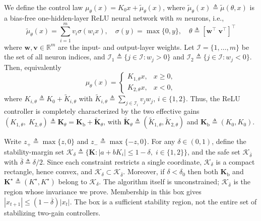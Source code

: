 \documentclass[letterpaper, 10 pt, conference]{ieeeconf}
\newcommand{\R}{\mathbb{R}}
\newcommand{\bv}{\mathbf{v}}
\newcommand{\bw}{\mathbf{w}}
\newcommand{\bK}{\mathbf{K}}
\newcommand{\cK}{\mathcal{K}}
\newcommand{\sI}{\mathscr{I}}
\begin{document}
We define the control law $\mu_{\theta} (x) = K_{0} x + \widetilde{\mu}_{\theta}(x)$, where $\widetilde{\mu}_{\theta}(x) \triangleq \widetilde{\mu}(\theta, x)$ is a bias-free one-hidden-layer ReLU neural network with $m$ neurons, i.e.,
\begin{equation} \label{eq_neural_cntr_def}
    \widetilde\mu_{\theta}(x) {=} \sum_{i=1}^{m} v_i \sigma(w_i x), \quad \sigma(y) {=} \max\{0,y\}, \quad \theta {\triangleq} [\bw^{\top}\; \bv^{\top}]^{\top}
\end{equation}
where $\bw, \bv \in \R^{m}$ are the input- and output-layer weights. Let $\sI=\{1,\dots,m\}$ be the set of all neuron indices, and $\sI_1\triangleq\{j\in\sI:w_j > 0\}$ and $\sI_2\triangleq\{j\in\sI:w_j<0\}$. Then, equivalently
\begin{equation}
    \mu_{\theta}(x) =
    \begin{cases}
        K_{1,\theta} x, & x \ge 0, \\
        K_{2,\theta} x, & x < 0,
    \end{cases}
    \label{eq_piecewise_controller}
\end{equation}
where $K_{i,\theta} {\triangleq} K_{0} {+} \widetilde{K}_{i,\theta}$ with $\widetilde{K}_{i,\theta} {\triangleq} \sum_{j \in \sI_{i}} v_{j} w_{j}$, $i \in \{1,2\}$. Thus, the ReLU controller is completely characterized by the two effective gains $(K_{1,\theta},\; K_{2,\theta}) \triangleq \bK_{\theta}= \bK_{\mathrm b} + \widetilde{\bK}_{\theta}$, with $\widetilde{\bK}_{\theta} \triangleq (\widetilde{K}_{1,\theta}, \widetilde{K}_{2,\theta})$ and $\bK_{\mathrm b} \triangleq (K_{0}, K_{0})$.
 
Write $z_{+}\triangleq\max\{z,0\}$ and $z_{-}\triangleq\max\{-z,0\}$. For any $\delta \in (0,1)$, define the stability-margin set
$
    \cK_{\delta} \triangleq \{ \bK : |a+bK_{i}| \le 1-\delta,\; i \in \{1, 2\} \}
$, and the safe set $\cK_{\overline{\delta}}$ with $\overline{\delta} \triangleq \delta/2$. Since each constraint restricts a single coordinate, $\cK_{\delta}$ is a compact rectangle, hence convex, and $\cK_{\delta} \subset \cK_{\overline{\delta}}$. Moreover, if $\delta < \delta_{0}$ then both $\bK_{\mathrm b}$ and $\bK^{\star} \triangleq (K^{\star},K^{\star})$ belong to $\cK_{\delta}$. The algorithm itself is unconstrained; $\cK_{\overline{\delta}}$ is the region whose invariance we prove. Membership in this box gives $|x_{t+1}|\le(1-\overline\delta)|x_t|$. The box is a sufficient stability region, not the entire set of stabilizing two-gain controllers. 
\end{document}
